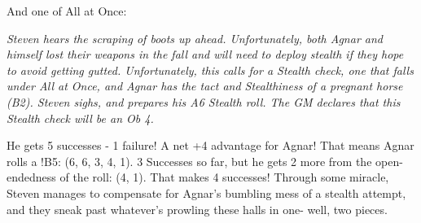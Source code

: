 \documentclass[../main.tex]{subfiles}
\begin{document}
        And one of All at Once:

        \begin{displayquote}
            {\em Steven hears the scraping of boots up ahead. Unfortunately, both Agnar and himself lost their weapons in the fall and will need to deploy stealth if they hope to avoid getting gutted. Unfortunately, this calls for a Stealth check, one that falls under All at Once, and Agnar has the tact and Stealthiness of a pregnant horse (B2). Steven sighs, and prepares his A6 Stealth roll. The GM declares that this Stealth check will be an Ob 4.
        
            He gets 5 successes - 1 failure! A net +4 advantage for Agnar! That means Agnar rolls a !B5: (6, 6, 3, 4, 1). 3 Successes so far, but he gets 2 more from the open-endedness of the roll: (4, 1). That makes 4 successes! Through some miracle, Steven manages to compensate for Agnar's bumbling mess of a stealth attempt, and they sneak past whatever's prowling these halls in one- well, two pieces.}
    \end{displayquote}
\end{document}
